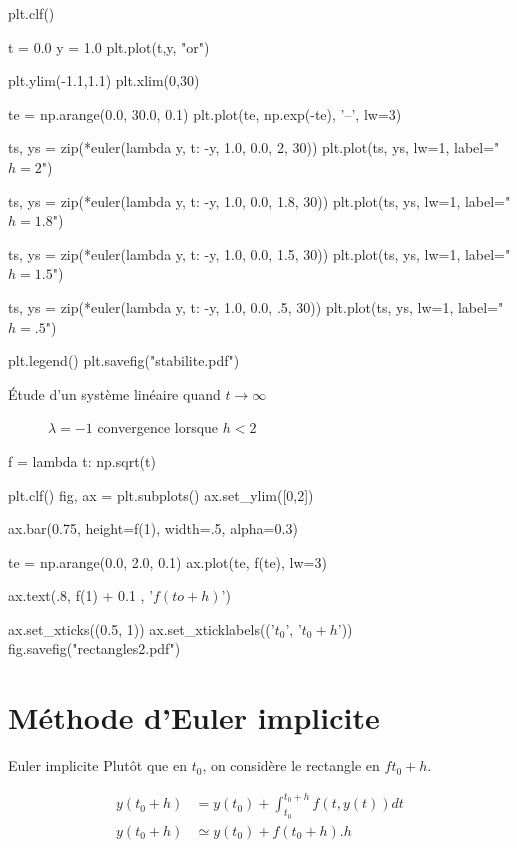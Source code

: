 \documentclass{beamer}
\begin{document}
\begin{pycode}
    plt.clf()

    t = 0.0
    y = 1.0
    plt.plot(t,y, "or")

    plt.ylim(-1.1,1.1)
    plt.xlim(0,30)

    te = np.arange(0.0, 30.0, 0.1)
    plt.plot(te, np.exp(-te), '--', lw=3)

    ts, ys = zip(*euler(lambda y, t: -y, 1.0, 0.0, 2, 30))
    plt.plot(ts, ys, lw=1, label="$h=2$")

    ts, ys = zip(*euler(lambda y, t: -y, 1.0, 0.0, 1.8, 30))
    plt.plot(ts, ys, lw=1, label="$h=1.8$")

    ts, ys = zip(*euler(lambda y, t: -y, 1.0, 0.0, 1.5, 30))
    plt.plot(ts, ys, lw=1, label="$h=1.5$")

    ts, ys = zip(*euler(lambda y, t: -y, 1.0, 0.0, .5, 30))
    plt.plot(ts, ys, lw=1, label="$h=.5$")


    plt.legend()
    plt.savefig("stabilite.pdf")
\end{pycode}

\begin{frame}{Étude d'un système linéaire quand $t \rightarrow \infty$}
    \begin{figure}
        \caption{$\lambda=-1$ convergence lorsque $h<2$}
    \end{figure}
\end{frame}

\begin{pycode}
    f = lambda t: np.sqrt(t)

    plt.clf()
    fig, ax = plt.subplots()
    ax.set_ylim([0,2])

    ax.bar(0.75, height=f(1), width=.5, alpha=0.3)

    te = np.arange(0.0, 2.0, 0.1)
    ax.plot(te, f(te), lw=3)

    ax.text(.8, f(1) + 0.1 , '$f(to+h)$')

    ax.set_xticks((0.5, 1))
    ax.set_xticklabels(('$t_0$', '$t_0+h$'))
    fig.savefig("rectangles2.pdf")
\end{pycode}

\section{Méthode d'Euler implicite}

\begin{frame}{Euler implicite}
    Plutôt que en $t_0$, on considère le rectangle en $ft_0+h$.
    \vspace{-.25cm}
    \begin{figure}
    \end{figure}
    \vspace{-.5cm}
    \begin{align*}
        y(t_0+h) & =  y(t_0) + \int_{t_0}^{t_0+h} f(t,y(t)) dt \\
        y(t_0+h) & \simeq  y(t_0) + f(t_0 + h).h               \\
    \end{align*}
\end{frame}
\end{document}
